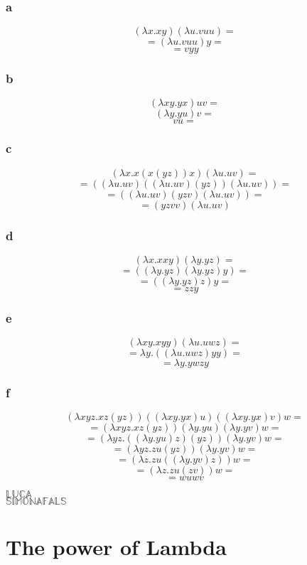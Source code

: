 \documentclass[11pt]{article}
\begin{document}
\subsubsection*{a}
\[
(\lambda x.xy) (\lambda u.vuu) =
\]
\[
= (\lambda u.vuu)y =
\]
\[
= vyy
\]


\subsubsection*{b}
\[
(\lambda xy.yx)uv =
\]
\[
(\lambda y.yu)v =
\]
\[
vu =
\]


\subsubsection*{c}
\[
(\lambda x.x(x(yz))x)(\lambda u.uv) =
\]
\[
= ((\lambda u.uv)((\lambda u.uv)(yz))(\lambda u.uv)) =
\]
\[
= ((\lambda u.uv)(yzv)(\lambda u.uv)) =
\]
\[
= (yzvv)(\lambda u.uv)
\]


\subsubsection*{d}
\[
(\lambda x.xxy)(\lambda y.yz) =
\]
\[
= ((\lambda y.yz)(\lambda y.yz)y) =
\]
\[
= ((\lambda y.yz)z)y =
\]
\[
= zzy
\]



\subsubsection*{e}
\[
(\lambda xy.xyy)(\lambda u.uwz) =
\]
\[
= \lambda y.((\lambda u.uwz)yy) =
\]
\[
= \lambda y.ywzy
\]



\subsubsection*{f}
\[
(\lambda xyz.xz(yz))((\lambda xy.yx)u)((\lambda xy.yx)v)w =
\]
\[
= (\lambda xyz.xz(yz)) (\lambda y.yu) (\lambda y.yv) w =
\]
\[
= (\lambda yz.((\lambda y.yu)z)(yz)) (\lambda y.yv) w =
\]
\[
= (\lambda yz.zu(yz)) (\lambda y.yv) w =
\]
\[
= (\lambda z.zu((\lambda y.yv)z)) w =
\]
\[
= (\lambda z.zu(zv)) w =
\]
\[
= wuwv
\]




$\mathbb{LUCA}$\\
$\mathbb{SIMONA FALS}$

\section*{The power of Lambda}
\end{document}
